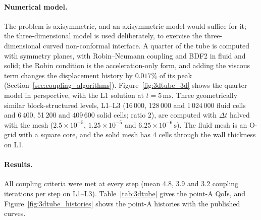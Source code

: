 \paragraph{Numerical model.}
The problem is axisymmetric, and an axisymmetric model would suffice for it; the three-dimensional model is used deliberately, to exercise the three-dimensional curved non-conformal interface. A quarter of the tube is computed with symmetry planes, with Robin--Neumann coupling and BDF2 in fluid and solid; the Robin condition is the acceleration-only form, and adding the viscous term changes the displacement history by $0.017\%$ of its peak (Section~\ref{sec:coupling_algorithms}).
Figure~\ref{fig:3dtube_3d} shows the quarter model in perspective, with the L1 solution at $t = 5\,\mathrm{ms}$.
Three geometrically similar block-structured levels, L1--L3 (16\,000, 128\,000 and 1\,024\,000 fluid cells and 6\,400, 51\,200 and 409\,600 solid cells; ratio 2), are computed with $\Delta t$ halved with the mesh ($2.5\times10^{-5}$, $1.25\times10^{-5}$ and $6.25\times10^{-6}\,\mathrm{s}$).
The fluid mesh is an O-grid with a square core, and the solid mesh has 4 cells through the wall thickness on L1.

\paragraph{Results.}
All coupling criteria were met at every step (mean 4.8, 3.9 and 3.2 coupling iterations per step on L1--L3). Table~\ref{tab:3dtube} gives the point-A QoIs, and Figure~\ref{fig:3dtube_histories} shows the point-A histories with the published curves.

